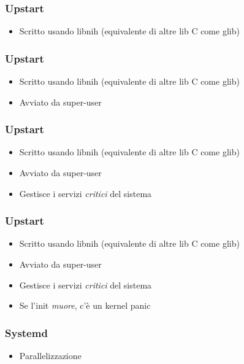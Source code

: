 \documentclass{beamer}
\begin{document}

\begin{frame}
	\frametitle{Upstart}
	\begin{itemize}
		\item Scritto usando libnih (equivalente di altre lib C come glib)
	\end{itemize}
\end{frame}


\begin{frame}
	\frametitle{Upstart}
	\begin{itemize}
		\item Scritto usando libnih (equivalente di altre lib C come glib)
		\item Avviato da super-user
	\end{itemize}
\end{frame}


\begin{frame}
	\frametitle{Upstart}
	\begin{itemize}
		\item Scritto usando libnih (equivalente di altre lib C come glib)
		\item Avviato da super-user
		\item Gestisce i servizi \textit{critici} del sistema
	\end{itemize}
\end{frame}


\begin{frame}
\frametitle{Upstart}
\begin{itemize}
	\item Scritto usando libnih (equivalente di altre lib C come glib)
	\item Avviato da super-user
	\item Gestisce i servizi \textit{critici} del sistema
	\item Se l'init \textit{muore}, c'\`e un kernel panic
\end{itemize}
\end{frame}


\begin{frame}
\frametitle{Systemd}
\begin{itemize}
	\item Parallelizzazione
\end{itemize}
\end{frame}
\end{document}
